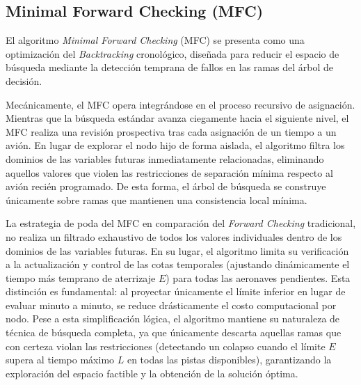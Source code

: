 \documentclass[12pt]{article}
\begin{document}
\subsection{Minimal Forward Checking (MFC)}

El algoritmo \textit{Minimal Forward Checking} (MFC) se presenta como una optimización del \textit{Backtracking} cronológico, diseñada para reducir el espacio de búsqueda mediante la detección temprana de fallos en las ramas del árbol de decisión.

Mecánicamente, el MFC opera integrándose en el proceso recursivo de asignación. Mientras que la búsqueda estándar avanza ciegamente hacia el siguiente nivel, el MFC realiza una revisión prospectiva tras cada asignación de un tiempo a un avión. En lugar de explorar el nodo hijo de forma aislada, el algoritmo filtra los dominios de las variables futuras inmediatamente relacionadas, eliminando aquellos valores que violen las restricciones de separación mínima respecto al avión recién programado. De esta forma, el árbol de búsqueda se construye únicamente sobre ramas que mantienen una consistencia local mínima.

La estrategia de poda del MFC en comparación del \textit{Forward Checking} tradicional, no realiza un filtrado exhaustivo de todos los valores individuales dentro de los dominios de las variables futuras. En su lugar, el algoritmo limita su verificación a la actualización y control de las cotas temporales (ajustando dinámicamente el tiempo más temprano de aterrizaje $E$) para todas las aeronaves pendientes. Esta distinción es fundamental: al proyectar únicamente el límite inferior en lugar de evaluar minuto a minuto, se reduce drásticamente el costo computacional por nodo. Pese a esta simplificación lógica, el algoritmo mantiene su naturaleza de técnica de búsqueda completa, ya que únicamente descarta aquellas ramas que con certeza violan las restricciones (detectando un colapso cuando el límite $E$ supera al tiempo máximo $L$ en todas las pistas disponibles), garantizando la exploración del espacio factible y la obtención de la solución óptima.\\
\end{document}
